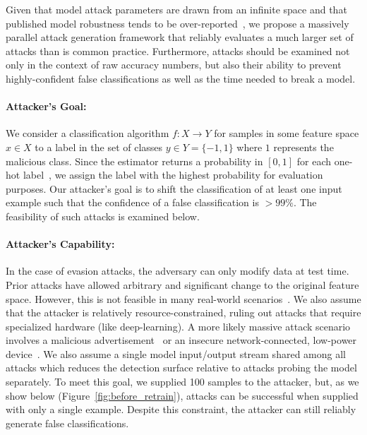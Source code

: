 \documentclass[fonts]{icst}
\begin{document}
Given that model attack parameters are drawn from an infinite space and that published model robustness tends to be over-reported~\cite{croce2020reliable}, we propose a massively parallel attack generation framework that reliably evaluates a much larger set of attacks than is common practice.
Furthermore, attacks should be examined not only in the context of raw accuracy numbers, but also their ability to prevent highly-confident false classifications as well as the time needed to break a model.


\paragraph{Attacker's Goal: }


We consider a classification algorithm $f: X \rightarrow Y $ for samples in some feature space $x \in X$ to a label in the set of classes $y \in Y = \{ -1, 1\}$ where $1$ represents the malicious class.
Since the estimator returns a probability in $[0,1]$ for each one-hot label~\cite{scikit-learn}, we assign the label with the highest probability for evaluation purposes.
Our attacker's goal is to shift the classification of at least one input example such that the confidence of a false classification is $>99\%$.
The feasibility of such attacks is examined below.


\paragraph{Attacker's Capability: }


In the case of evasion attacks, the adversary can only modify data at test time.
Prior attacks have allowed arbitrary and significant change to the original feature space.
However, this is not feasible in many real-world scenarios~\cite{biggio2013evasion}.
We also assume that the attacker is relatively resource-constrained, ruling out attacks that require specialized hardware (like deep-learning).
A more likely massive attack scenario involves a malicious advertisement~\cite{liu_2020} or an insecure network-connected, low-power device~\cite{meidan_2018}.
We also assume a single model input/output stream shared among all attacks which reduces the detection surface relative to attacks probing the model separately.
To meet this goal, we supplied 100 samples to the attacker, but, as we show below (Figure~\ref{fig:before_retrain}), attacks can be successful when supplied with only a single example.
Despite this constraint, the attacker can still reliably generate false classifications.
\end{document}
